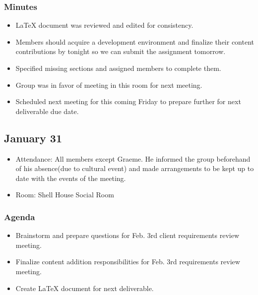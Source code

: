 \documentclass{article}
\begin{document}
\subsubsection{Minutes}
\begin{itemize}
\item LaTeX document was reviewed and edited for consistency.
\item Members should acquire a development environment and finalize their content contributions by tonight so we can submit the assignment tomorrow.
\item Specified missing sections and assigned members to complete them.
\item Group was in favor of meeting in this room for next meeting.
\item Scheduled next meeting for this coming Friday to prepare further for next deliverable due date.
\end{itemize}

\subsection{January 31}
\begin{itemize}
\item Attendance: All members except Graeme.  He informed the group beforehand of his absence(due to cultural event) and made arrangements to be kept up to date with the events of the meeting.
\item Room: Shell House Social Room
\end{itemize}
\subsubsection{Agenda}
\begin{itemize}
\item Brainstorm and prepare questions for Feb. 3rd client requirements review meeting.
\item Finalize content addition responsibilities for Feb. 3rd requirements review meeting.  
\item Create LaTeX document for next deliverable.
\end{itemize}
\end{document}
